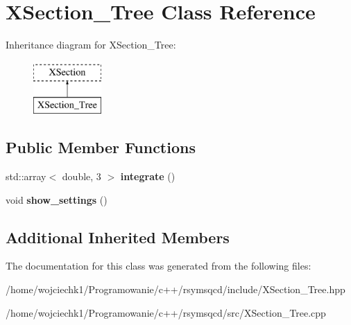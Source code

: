 \hypertarget{classXSection__Tree}{}\section{X\+Section\+\_\+\+Tree Class Reference}
\label{classXSection__Tree}
Inheritance diagram for X\+Section\+\_\+\+Tree\+:\begin{figure}[H]
\begin{center}
\leavevmode
\includegraphics[height=2.000000cm]{classXSection__Tree}
\end{center}
\end{figure}
\subsection*{Public Member Functions}
\begin{DoxyCompactItemize}
\item 
\mbox{\label{classXSection__Tree_a23fa57cf909c85640de9598e63285b14}} 
std\+::array$<$ double, 3 $>$ {\bfseries integrate} ()
\item 
\mbox{\label{classXSection__Tree_adcdb3a71719870771d3c863dc41dc20a}} 
void {\bfseries show\+\_\+settings} ()
\end{DoxyCompactItemize}
\subsection*{Additional Inherited Members}


The documentation for this class was generated from the following files\+:\begin{DoxyCompactItemize}
\item 
/home/wojciechk1/\+Programowanie/c++/rsymsqcd/include/X\+Section\+\_\+\+Tree.\+hpp\item 
/home/wojciechk1/\+Programowanie/c++/rsymsqcd/src/X\+Section\+\_\+\+Tree.\+cpp\end{DoxyCompactItemize}
